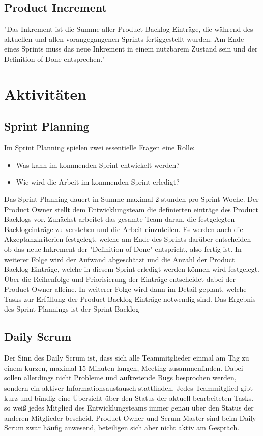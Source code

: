 \documentclass[a4paper, twopage]{scrreprt}
\begin{document}
\subsection{Product Increment}
"Das Inkrement ist die Summe aller Product-Backlog-Einträge, die während des aktuellen und allen vorangegangenen Sprints fertiggestellt wurden. Am Ende eines Sprints muss das neue Inkrement in einem nutzbarem Zustand sein und der Definition of Done entsprechen."\cite{wikipedia:scrum}

\section{Aktivitäten}
\subsection{Sprint Planning}
Im Sprint Planning spielen zwei essentielle Fragen eine Rolle:
\begin{itemize}
	\item Was kann im kommenden Sprint entwickelt werden?
	\item Wie wird die Arbeit im kommenden Sprint erledigt?
\end{itemize}
Das Sprint Planning dauert in Summe maximal 2 stunden pro Sprint Woche.
Der Product Owner stellt dem Entwicklungsteam die definierten einträge des Product Backlogs vor. Zunächst arbeitet das gesamte Team daran, die festgelegten Backlogeinträge zu verstehen und die Arbeit einzuteilen.
Es werden auch die Akzeptanzkriterien festgelegt, welche am Ende des Sprints darüber entscheiden ob das neue Inkrement der "Definition of Done" entspricht, also fertig ist. In weiterer Folge wird der Aufwand abgeschätzt und die Anzahl der Product Backlog Einträge, welche in diesem Sprint erledigt werden können wird festgelegt. Über die Reihenfolge und Priorisierung der Einträge entscheidet dabei der Product Owner alleine.
In weiterer Folge wird dann im Detail geplant, welche Tasks zur Erfüllung der Product Backlog Einträge notwendig sind.
Das Ergebnis des Sprint Plannings ist der Sprint Backlog
\subsection{Daily Scrum}
Der Sinn des Daily Scrum ist, dass sich alle Teammitglieder einmal am Tag zu einem kurzen, maximal 15 Minuten langen, Meeting zusammenfinden. Dabei sollen allerdings nicht Probleme und auftretende Bugs besprochen werden, sondern ein aktiver Informationsaustausch stattfinden. Jedes Teammitglied gibt kurz und bündig eine Übersicht über den Status der aktuell bearbeiteten Tasks. so weiß jedes Mitglied des Entwicklungsteams immer genau über den Status der anderen Mitglieder bescheid.
Product Owner und Scrum Master sind beim Daily Scrum zwar häufig anwesend, beteiligen sich aber nicht aktiv am Gespräch.
\end{document}
